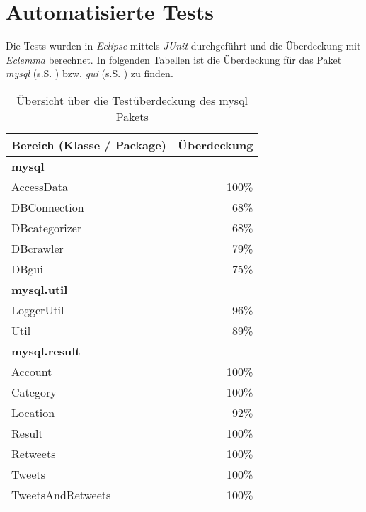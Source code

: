 \section{Automatisierte Tests}
Die Tests wurden in \emph{Eclipse} mittels \emph{JUnit} durchgeführt und die Überdeckung mit \emph{Eclemma} berechnet.
In folgenden Tabellen ist die Überdeckung für das Paket \emph{mysql} (s.S. \pageref{tbl:coverageMysql}) bzw. \emph{gui}
(s.S. \pageref{tbl:coverageGui}) zu finden.
\begin{table}[h]
	\centering
	\begin{tabular} {l||r}
		\label{tbl:coverageMysql}
		Bereich (Klasse / Package) & Überdeckung \\
		\hline
		\hline
		\textbf{mysql} & \\
		\hspace*{3mm}AccessData & 100\% \\
		\hspace*{3mm}DBConnection & 68\% \\
		\hspace*{3mm}DBcategorizer & 68\% \\
		\hspace*{3mm}DBcrawler & 79\% \\
		\hspace*{3mm}DBgui & 75\% \\
		\hline
		\textbf{mysql.util} & \\
		\hspace*{3mm}LoggerUtil & 96\% \\
		\hspace*{3mm}Util & 89\% \\
		\hline
		\textbf{mysql.result} & \\
		\hspace*{3mm}Account & 100\% \\
		\hspace*{3mm}Category & 100\% \\
		\hspace*{3mm}Location & 92\% \\
		\hspace*{3mm}Result & 100\% \\
		\hspace*{3mm}Retweets & 100\% \\
		\hspace*{3mm}Tweets & 100\% \\
		\hspace*{3mm}TweetsAndRetweets & 100\% \\
	\end{tabular}
	\caption{Übersicht über die Testüberdeckung des mysql Pakets}
\end{table}
